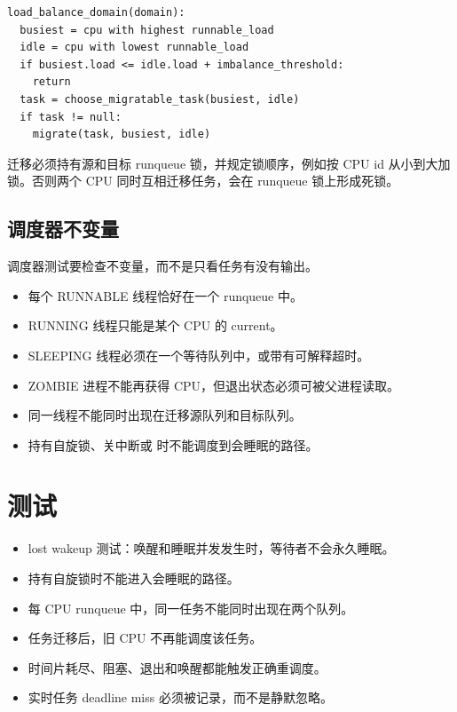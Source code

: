\begin{lstlisting}
load_balance_domain(domain):
  busiest = cpu with highest runnable_load
  idle = cpu with lowest runnable_load
  if busiest.load <= idle.load + imbalance_threshold:
    return
  task = choose_migratable_task(busiest, idle)
  if task != null:
    migrate(task, busiest, idle)
\end{lstlisting}

迁移必须持有源和目标 runqueue 锁，并规定锁顺序，例如按 CPU id 从小到大加锁。否则两个 CPU 同时互相迁移任务，会在 runqueue 锁上形成死锁。

\subsection{调度器不变量}

调度器测试要检查不变量，而不是只看任务有没有输出。

\begin{rubricbox}
\begin{itemize}
\tightlist
\item 每个 RUNNABLE 线程恰好在一个 runqueue 中。
\item RUNNING 线程只能是某个 CPU 的 current。
\item SLEEPING 线程必须在一个等待队列中，或带有可解释超时。
\item ZOMBIE 进程不能再获得 CPU，但退出状态必须可被父进程读取。
\item 同一线程不能同时出现在迁移源队列和目标队列。
\item 持有自旋锁、关中断或  时不能调度到会睡眠的路径。
\end{itemize}
\end{rubricbox}

\section{测试}

\begin{itemize}
\tightlist
\item lost wakeup 测试：唤醒和睡眠并发发生时，等待者不会永久睡眠。
\item 持有自旋锁时不能进入会睡眠的路径。
\item 每 CPU runqueue 中，同一任务不能同时出现在两个队列。
\item 任务迁移后，旧 CPU 不再能调度该任务。
\item 时间片耗尽、阻塞、退出和唤醒都能触发正确重调度。
\item 实时任务 deadline miss 必须被记录，而不是静默忽略。
\end{itemize}
